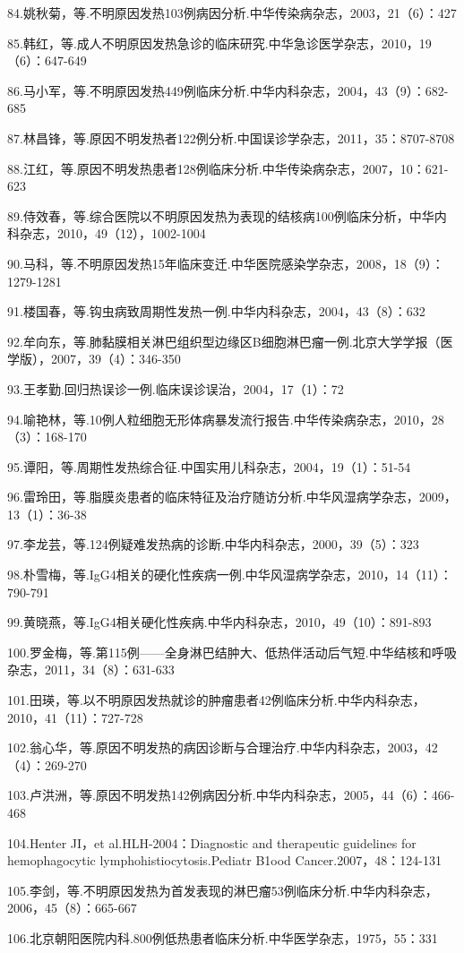 84.姚秋菊，等.不明原因发热103例病因分析.中华传染病杂志，2003，21（6）：427

85.韩红，等.成人不明原因发热急诊的临床研究.中华急诊医学杂志，2010，19（6）：647-649

86.马小军，等.不明原因发热449例临床分析.中华内科杂志，2004，43（9）：682-685

87.林昌锋，等.原因不明发热者122例分析.中国误诊学杂志，2011，35：8707-8708

88.江红，等.原因不明发热患者128例临床分析.中华传染病杂志，2007，10：621-623

89.侍效春，等.综合医院以不明原因发热为表现的结核病100例临床分析，中华内科杂志，2010，49（12），1002-1004

90.马科，等.不明原因发热15年临床变迁.中华医院感染学杂志，2008，18（9）：1279-1281

91.楼国春，等.钩虫病致周期性发热一例.中华内科杂志，2004，43（8）：632

92.牟向东，等.肺黏膜相关淋巴组织型边缘区B细胞淋巴瘤一例.北京大学学报（医学版），2007，39（4）：346-350

93.王孝勤.回归热误诊一例.临床误诊误治，2004，17（1）：72

94.喻艳林，等.10例人粒细胞无形体病暴发流行报告.中华传染病杂志，2010，28（3）：168-170

95.谭阳，等.周期性发热综合征.中国实用儿科杂志，2004，19（1）：51-54

96.雷玲田，等.脂膜炎患者的临床特征及治疗随访分析.中华风湿病学杂志，2009，13（1）：36-38

97.李龙芸，等.124例疑难发热病的诊断.中华内科杂志，2000，39（5）：323

98.朴雪梅，等.IgG4相关的硬化性疾病一例.中华风湿病学杂志，2010，14（11）：790-791

99.黄晓燕，等.IgG4相关硬化性疾病.中华内科杂志，2010，49（10）：891-893

100.罗金梅，等.第115例------全身淋巴结肿大、低热伴活动后气短.中华结核和呼吸杂志，2011，34（8）：631-633

101.田瑛，等.以不明原因发热就诊的肿瘤患者42例临床分析.中华内科杂志，2010，41（11）：727-728

102.翁心华，等.原因不明发热的病因诊断与合理治疗.中华内科杂志，2003，42（4）：269-270

103.卢洪洲，等.原因不明发热142例病因分析.中华内科杂志，2005，44（6）：466-468

104.Henter JI，et al.HLH-2004：Diagnostic and therapeutic guidelines for
hemophagocytic lymphohistiocytosis.Pediatr B1ood
Cancer.2007，48：124-131

105.李剑，等.不明原因发热为首发表现的淋巴瘤53例临床分析.中华内科杂志，2006，45（8）：665-667

106.北京朝阳医院内科.800例低热患者临床分析.中华医学杂志，1975，55：331

\protect\hypertarget{text00043.html}{}{}

